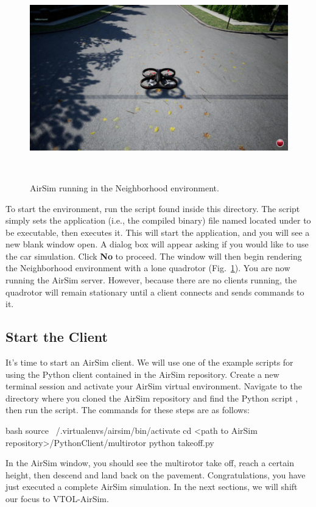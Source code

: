 \begin{figure}[ht]
    \centering
    \includegraphics[height=250pt]{figures/airsimnh}
    \caption[AirSim Neighborhood Environment]{
        AirSim running in the Neighborhood environment.}%
    \label{fig:airsimnh}
\end{figure}

To start the environment, run the script  found inside this directory. The script simply sets the application (i.e., the compiled binary) file named  located under  to be executable, then executes it. This will start the application, and you will see a new blank window open. A dialog box will appear asking if you would like to use the car simulation. Click \textbf{No} to proceed. The window will then begin rendering the Neighborhood environment with a lone quadrotor (Fig.~\ref{fig:airsimnh}). You are now running the AirSim server. However, because there are no clients running, the quadrotor will remain stationary until a client connects and sends commands to it.

\subsection{Start the Client}
It's time to start an AirSim client. We will use one of the example scripts for using the Python client contained in the AirSim repository. Create a new terminal session and activate your AirSim virtual environment. Navigate to the directory where you cloned the AirSim repository and find the Python script , then run the script. The commands for these steps are as follows:
\begin{minttcb}{bash}
    source ~/.virtualenvs/airsim/bin/activate
    cd <path to AirSim repository>/PythonClient/multirotor
    python takeoff.py
\end{minttcb}
In the AirSim window, you should see the multirotor take off, reach a certain height, then descend and land back on the pavement. Congratulations, you have just executed a complete AirSim simulation. In the next sections, we will shift our focus to VTOL-AirSim.

